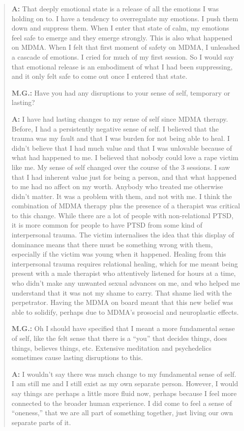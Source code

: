 \documentclass[11pt,oneside]{book}
\begin{document}
\begin{quotation}
    \textbf{A:} That deeply emotional state is a release of all the emotions I was holding on to. I have a tendency to overregulate my emotions. I push them down and suppress them. When I enter that state of calm, my emotions feel safe to emerge and they emerge strongly. This is also what happened on MDMA. When I felt that first moment of safety on MDMA, I unleashed a cascade of emotions. I cried for much of my first session. So I would say that emotional release is an embodiment of what I had been suppressing, and it only felt safe to come out once I entered that state.

    \vspace{\baselineskip}

    \textbf{M.G.:} Have you had any disruptions to your sense of self, temporary or lasting?

    \textbf{A:} I have had lasting changes to my sense of self since MDMA therapy. Before, I had a persistently negative sense of self. I believed that the trauma was my fault and that I was burden for not being able to heal. I didn't believe that I had much value and that I was unlovable because of what had happened to me. I believed that nobody could love a rape victim like me. My sense of self changed over the course of the 3 sessions. I saw that I had inherent value just for being a person, and that what happened to me had no affect on my worth. Anybody who treated me otherwise didn't matter. It was a problem with them, and not with me. I think the combination of MDMA therapy plus the presence of a therapist was critical to this change. While there are a lot of people with non-relational PTSD, it is more common for people to have PTSD from some kind of interpersonal trauma. The victim internalises the idea that this display of dominance means that there must be something wrong with them, especially if the victim was young when it happened. Healing from this interpersonal trauma requires relational healing, which for me meant being present with a male therapist who attentively listened for hours at a time, who didn't make any unwanted sexual advances on me, and who helped me understand that it was not my shame to carry. That shame lied with the perpetrator. Having the MDMA on board meant that this new belief was able to solidify, perhaps due to MDMA's prosocial and neuroplastic effects.

    \vspace{\baselineskip}

    \textbf{M.G.:} Oh I should have specified that I meant a more fundamental sense of self, like the felt sense that there is a \enquote{you} that decides things, does things, believes things, etc. Extensive meditation and psychedelics sometimes cause lasting disruptions to this.

    \textbf{A:} I wouldn't say there was much change to my fundamental sense of self. I am still me and I still exist as my own separate person. However, I would say things are perhaps a little more fluid now, perhaps because I feel more connected to the broader human experience. I did come to feel a sense of \enquote{oneness,} that we are all part of something together, just living our own separate parts of it.
\end{quotation}
\end{document}
